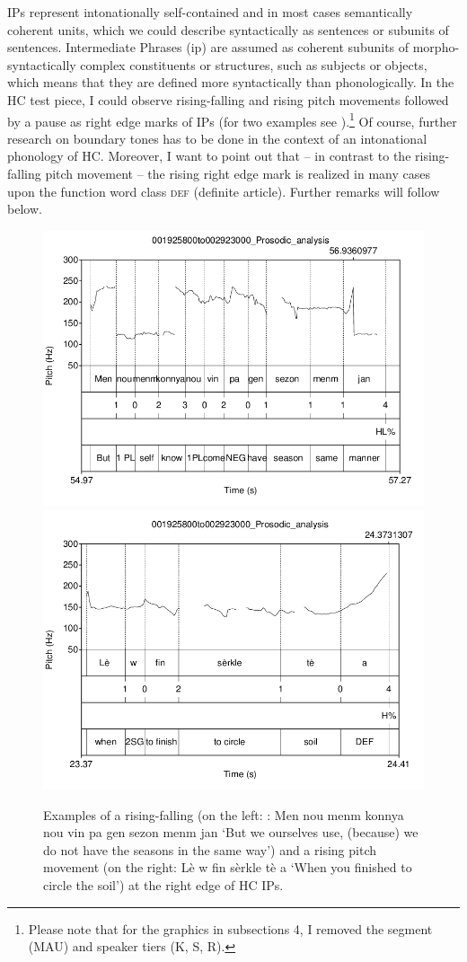 \documentclass[output=paper]{langsci/langscibook}
\begin{document}
IPs represent intonationally self-contained and in most cases semantically coherent units, which we could describe syntactically as sentences or subunits of sentences. Intermediate Phrases (ip) are assumed as coherent subunits of morpho-syntactically complex constituents or structures, such as subjects or objects, which means that they are defined more syntactically than phonologically. In the HC test piece, I could observe rising-falling and rising pitch movements followed by a pause as right edge marks of IPs (for two examples see ).\footnote{Please note that for the graphics in subsections 4, I removed the segment (MAU) and speaker tiers (K, S, R).} Of course, further research on boundary tones has to be done in the context of an intonational phonology of HC. Moreover, I want to point out that – in contrast to the rising-falling pitch movement – the rising right edge mark is realized in many cases upon the function word class \textsc{def} (definite article). Further remarks will follow below.

\begin{figure}  
\includegraphics[width=.45\textwidth]{figures/KALPeerreviewedkorr-img4.png}
\includegraphics[width=.45\textwidth]{figures/KALPeerreviewedkorr-img5.png}
\caption{\label{fig:kal:4} Examples of a rising-falling (on the left: : Men nou menm konnya nou vin pa gen sezon menm jan ‘But we ourselves use, (because) we do not have the seasons in the same way’) and a rising pitch movement (on the right: Lè w fin sèrkle tè a ‘When you finished to circle the soil’) at the right edge of HC IPs.
}
\end{figure}
\end{document}
